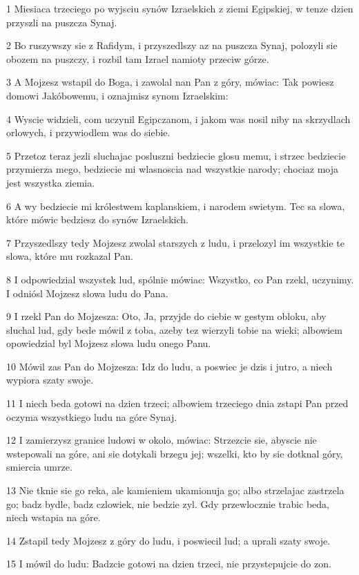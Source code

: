 \par 1 Miesiaca trzeciego po wyjsciu synów Izraelskich z ziemi Egipskiej, w tenze dzien przyszli na puszcza Synaj.
\par 2 Bo ruszywszy sie z Rafidym, i przyszedlszy az na puszcza Synaj, polozyli sie obozem na puszczy, i rozbil tam Izrael namioty przeciw górze.
\par 3 A Mojzesz wstapil do Boga, i zawolal nan Pan z góry, mówiac: Tak powiesz domowi Jakóbowemu, i oznajmisz synom Izraelskim:
\par 4 Wyscie widzieli, com uczynil Egipczanom, i jakom was nosil niby na skrzydlach orlowych, i przywiodlem was do siebie.
\par 5 Przetoz teraz jezli sluchajac posluszni bedziecie glosu memu, i strzec bedziecie przymierza mego, bedziecie mi wlasnoscia nad wszystkie narody; chociaz moja jest wszystka ziemia.
\par 6 A wy bedziecie mi królestwem kaplanskiem, i narodem swietym. Tec sa slowa, które mówic bedziesz do synów Izraelskich.
\par 7 Przyszedlszy tedy Mojzesz zwolal starszych z ludu, i przelozyl im wszystkie te slowa, które mu rozkazal Pan.
\par 8 I odpowiedzial wszystek lud, spólnie mówiac: Wszystko, co Pan rzekl, uczynimy. I odniósl Mojzesz slowa ludu do Pana.
\par 9 I rzekl Pan do Mojzesza: Oto, Ja, przyjde do ciebie w gestym obloku, aby sluchal lud, gdy bede mówil z toba, azeby tez wierzyli tobie na wieki; albowiem opowiedzial byl Mojzesz slowa ludu onego Panu.
\par 10 Mówil zas Pan do Mojzesza: Idz do ludu, a poswiec je dzis i jutro, a niech wypiora szaty swoje.
\par 11 I niech beda gotowi na dzien trzeci; albowiem trzeciego dnia zstapi Pan przed oczyma wszystkiego ludu na góre Synaj.
\par 12 I zamierzysz granice ludowi w okolo, mówiac: Strzezcie sie, abyscie nie wstepowali na góre, ani sie dotykali brzegu jej; wszelki, kto by sie dotknal góry, smiercia umrze.
\par 13 Nie tknie sie go reka, ale kamieniem ukamionuja go; albo strzelajac zastrzela go; badz bydle, badz czlowiek, nie bedzie zyl. Gdy przewlocznie trabic beda, niech wstapia na góre.
\par 14 Zstapil tedy Mojzesz z góry do ludu, i poswiecil lud; a uprali szaty swoje.
\par 15 I mówil do ludu: Badzcie gotowi na dzien trzeci, nie przystepujcie do zon.
